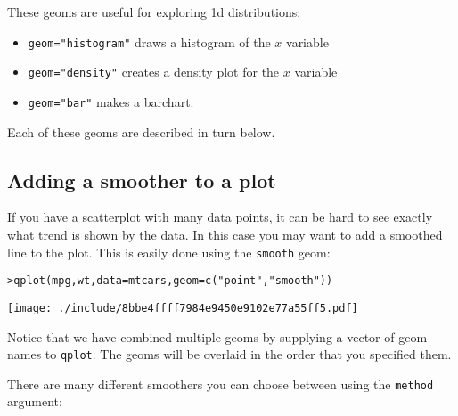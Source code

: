 These geoms are useful for exploring 1d distributions:

\begin{itemize}
	\item {\tt geom="histogram"} draws a histogram of the $x$ variable
	\item {\tt geom="density"} creates a density plot for the $x$ variable
	\item {\tt geom="bar"} makes a barchart.
\end{itemize}

Each of these geoms are described in turn below.

\subsection{Adding a smoother to a plot}\label{sub:smooth}

If you have a scatterplot with many data points, it can be hard to see exactly what trend is shown by the data.  In this case you may want to add a smoothed line to the plot.  This is easily done using the {\tt smooth} geom:

\begin{alltt}
> qplot(mpg, wt, data = mtcars, geom = c("point", "smooth"))
\end{alltt}
\texttt{[image: ./include/8bbe4ffff7984e9450e9102e77a55ff5.pdf]}
\begin{alltt}

\end{alltt}

Notice that we have combined multiple geoms by supplying a vector of geom names to {\tt qplot}.  The geoms will be overlaid in the order that you specified them.

There are many different smoothers you can choose between using the {\tt method} argument:

